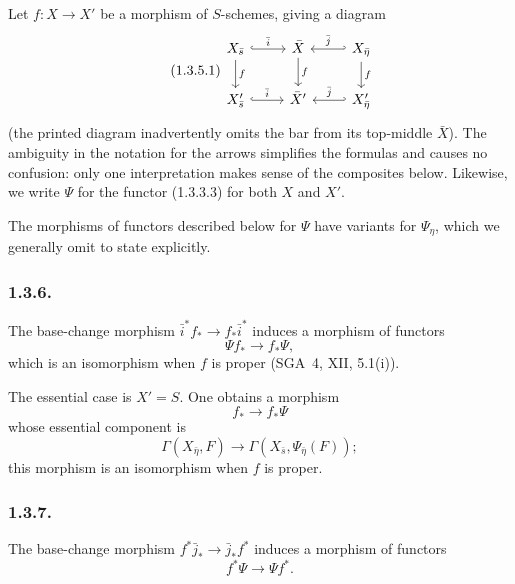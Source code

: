 Let $f:X\longrightarrow X'$ be a morphism of $S$-schemes, giving a
diagram
\begin{equation}\tag{1.3.5.1}
\begin{tikzcd}
X_{\bar s} \arrow[r, hook, "\bar i"] \arrow[d, "f"]
  & \bar X \arrow[d, "f"]
  & X_{\bar\eta} \arrow[l, hook', "\bar j"'] \arrow[d, "f"] \\
X'_{\bar s} \arrow[r, hook, "\bar i"]
  & \bar X' & X'_{\bar\eta} \arrow[l, hook', "\bar j"']
\end{tikzcd}
\end{equation}
(the printed diagram inadvertently omits the bar from its top-middle
$\bar X$).  The ambiguity in the notation for the arrows simplifies
the formulas and causes no confusion: only one interpretation makes
sense of the composites below.  Likewise, we write $\Psi$ for the
functor (1.3.3.3) for both $X$ and $X'$.

The morphisms of functors described below for $\Psi$ have variants for
$\Psi_\eta$, which we generally omit to state explicitly.

\subsubsection*{1.3.6.}
The base-change morphism
$\bar i^*f_*\longrightarrow f_*\bar i^*$ induces a morphism of
functors
\begin{equation}\tag{1.3.6.1}
\Psi f_*\longrightarrow f_*\Psi,
\end{equation}
which is an isomorphism when $f$ is proper (SGA~4, XII, 5.1(i)).

The essential case is $X'=S$.  One obtains a morphism
\begin{equation}\tag{1.3.6.2}
f_*\longrightarrow f_*\Psi
\end{equation}
whose essential component is
\begin{equation}\tag{1.3.6.3}
\Gamma(X_{\bar\eta},F)
\longrightarrow
\Gamma(X_{\bar s},\Psi_{\bar\eta}(F));
\end{equation}
this morphism is an isomorphism when $f$ is proper.

\subsubsection*{1.3.7.}
The base-change morphism
$f^*\bar j_*\longrightarrow\bar j_*f^*$ induces a morphism of
functors
\begin{equation}\tag{1.3.7.1}
f^*\Psi\longrightarrow\Psi f^*.
\end{equation}


